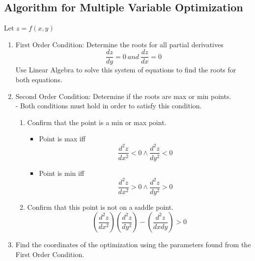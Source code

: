 \documentclass{book}
\begin{document}
\begin{enumerate}
\begin{enumerate}
            \subsection{Algorithm for Multiple Variable Optimization}
            Let $z = f(x,y)$
            \begin{enumerate}
                \item First Order Condition: Determine the roots for all partial derivatives\\
                \begin{equation*}
                    \frac{dz}{dy} = 0\ and\ \frac{dz}{dx} = 0
                \end{equation*}
                Use Linear Algebra to solve this system of equations to find the roots for both equations.
                \pagebreak
                \item Second Order Condition: Determine if the roots are max or min points.\\
                - Both conditions must hold in order to satisfy this condition.
                \begin{enumerate}
                    \item Confirm that the point is a min or max point.
                    \begin{itemize}
                        \item Point is max iff
                        \begin{equation*}
                            \frac{d^2z}{dx^2} < 0 \wedge \frac{d^2z}{dy^2} < 0 
                        \end{equation*}
                        \item Point is min iff
                        \begin{equation*}
                            \frac{d^2z}{dx^2} > 0 \wedge \frac{d^2z}{dy^2} > 0 
                        \end{equation*}
                    \end{itemize}
                    \item Confirm that this point is not on a saddle point.\\
                    \begin{equation*}
                        (\frac{d^2z}{dx^2})(\frac{d^2z}{dy^2}) - (\frac{d^2z}{dxdy}) > 0
                    \end{equation*} 
                \end{enumerate}
                \item Find the coordinates of the optimization using the parameters found from the First Order Condition.

\end{enumerate}
\end{enumerate}
\end{enumerate}
\end{document}
